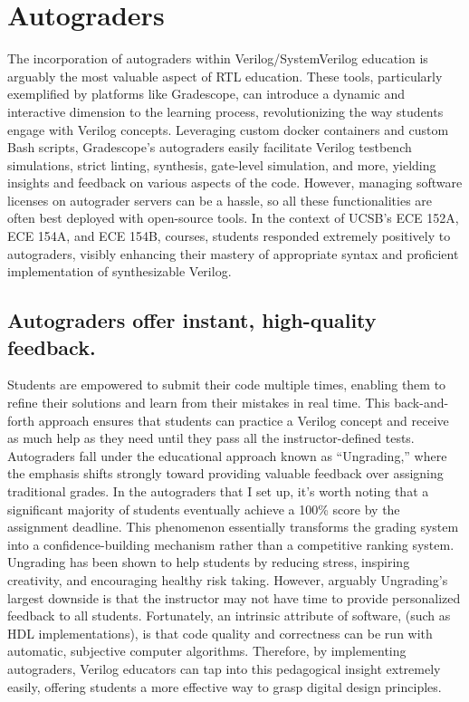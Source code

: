 
\chapter{Autograders}
\label{chapter:autograders}

The incorporation of autograders within Verilog/SystemVerilog education is arguably the most valuable aspect of RTL education. These tools, particularly exemplified by platforms like Gradescope, can introduce a dynamic and interactive dimension to the learning process, revolutionizing the way students engage with Verilog concepts. Leveraging custom docker containers and custom Bash scripts, Gradescope's autograders easily facilitate Verilog testbench simulations, strict linting, synthesis, gate-level simulation, and more, yielding insights and feedback on various aspects of the code. However, managing software licenses on autograder servers can be a hassle, so all these functionalities are often best deployed with open-source tools. In the context of UCSB's ECE 152A, ECE 154A, and ECE 154B, courses, students responded extremely positively to autograders, visibly enhancing their mastery of appropriate syntax and proficient implementation of synthesizable Verilog.

\section{Autograders offer instant, high-quality feedback.}

Students are empowered to submit their code multiple times, enabling them to refine their solutions and learn from their mistakes in real time. This back-and-forth approach ensures that students can practice a Verilog concept and receive as much help as they need until they pass all the instructor-defined tests. Autograders fall under the educational approach known as ``Ungrading,'' where the emphasis shifts strongly toward providing valuable feedback over assigning traditional grades. In the autograders that I set up, it's worth noting that a significant majority of students eventually achieve a 100\% score by the assignment deadline. This phenomenon essentially transforms the grading system into a confidence-building mechanism rather than a competitive ranking system. Ungrading has been shown to help students by reducing stress, inspiring creativity, and encouraging healthy risk taking. \cite{kohn:book, blum:article} However, arguably Ungrading's largest downside is that the instructor may not have time to provide personalized feedback to all students. Fortunately, an intrinsic attribute of software, (such as HDL implementations), is that code quality and correctness can be run with automatic, subjective computer algorithms. Therefore, by implementing autograders, Verilog educators can tap into this pedagogical insight extremely easily, offering students a more effective way to grasp digital design principles.

